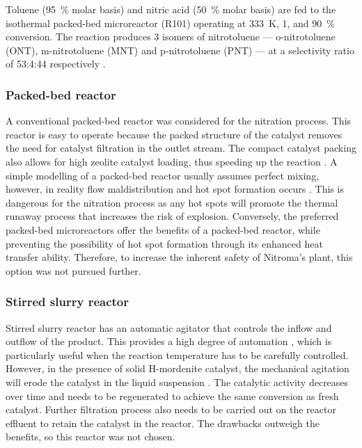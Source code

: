 Toluene (\SI{95}{\percent} molar basis) and nitric acid (\SI{50}{\percent} molar basis) are fed to the isothermal packed-bed microreactor (R101) operating at \SI{333}{\K}, \SI{1}{\atm}, and \SI{90}{\percent} conversion. The reaction produces 3 isomers of nitrotoluene --- o-nitrotoluene (ONT), m-nitrotoluene (MNT) and p-nitrotoluene (PNT) --- at a selectivity ratio of 53:4:44 respectively \cite{smith_novel_1998}.


\subsubsection{Packed-bed reactor}
A conventional packed-bed reactor was considered for the nitration process. This reactor is easy to operate because the packed structure of the catalyst removes the need for catalyst filtration in the outlet stream. The compact catalyst packing also allows for high zeolite catalyst loading, thus speeding up the reaction \cite{kashid_microstructured_2009}. A simple modelling of a packed-bed reactor usually assumes perfect mixing, however, in reality flow maldistribution and hot spot formation occurs \cite{nguyen_flow_1994}. This is dangerous for the nitration process as any hot spots will promote the thermal runaway process that increases the risk of explosion. Conversely, the preferred packed-bed microreactors offer the benefits of a packed-bed reactor, while preventing the possibility of hot spot formation through its enhanced heat transfer ability. Therefore, to increase the inherent safety of Nitroma's plant, this option was not pursued further.

\subsubsection{Stirred slurry reactor}
Stirred slurry reactor has an automatic agitator that controls the inflow and outflow of the product. This provides a high degree of automation \cite{liu_nitration_2019}, which is particularly useful when the reaction temperature has to be carefully controlled. However, in the presence of solid H-mordenite catalyst, the mechanical agitation will erode the catalyst in the liquid suspension \cite{argyle_heterogeneous_2015}. The catalytic activity decreases over time and needs to be regenerated to achieve the same conversion as fresh catalyst. Further filtration process also needs to be carried out on the reactor effluent to retain the catalyst in the reactor. The drawbacks outweigh the benefits, so this reactor was not chosen.


